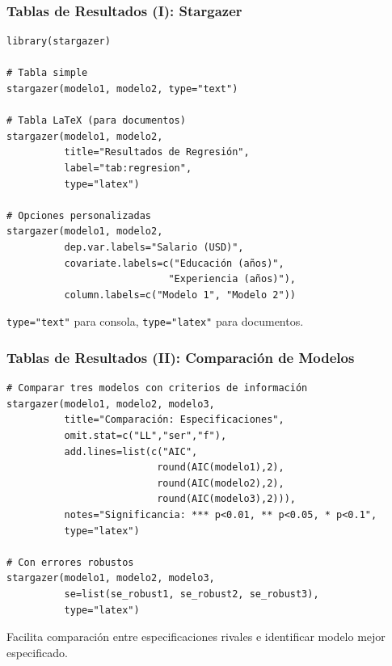 \documentclass[aspectratio=169,11pt]{beamer}
\begin{document}
\begin{frame}[fragile]
  \frametitle{Tablas de Resultados (I): Stargazer}

  \begin{lstlisting}
library(stargazer)

# Tabla simple
stargazer(modelo1, modelo2, type="text")

# Tabla LaTeX (para documentos)
stargazer(modelo1, modelo2,
          title="Resultados de Regresión",
          label="tab:regresion",
          type="latex")

# Opciones personalizadas
stargazer(modelo1, modelo2,
          dep.var.labels="Salario (USD)",
          covariate.labels=c("Educación (años)",
                            "Experiencia (años)"),
          column.labels=c("Modelo 1", "Modelo 2"))
  \end{lstlisting}

  \small
  \texttt{type="text"} para consola, \texttt{type="latex"} para documentos.
\end{frame}

\begin{frame}[fragile]
  \frametitle{Tablas de Resultados (II): Comparación de Modelos}

  \tiny
  \begin{lstlisting}
# Comparar tres modelos con criterios de información
stargazer(modelo1, modelo2, modelo3,
          title="Comparación: Especificaciones",
          omit.stat=c("LL","ser","f"),
          add.lines=list(c("AIC",
                          round(AIC(modelo1),2),
                          round(AIC(modelo2),2),
                          round(AIC(modelo3),2))),
          notes="Significancia: *** p<0.01, ** p<0.05, * p<0.1",
          type="latex")

# Con errores robustos
stargazer(modelo1, modelo2, modelo3,
          se=list(se_robust1, se_robust2, se_robust3),
          type="latex")
  \end{lstlisting}

  \small
  Facilita comparación entre especificaciones rivales e identificar modelo mejor especificado.
\end{frame}
\end{document}

